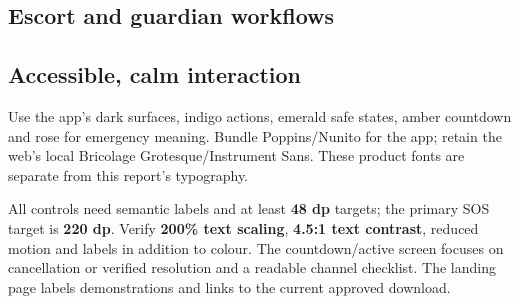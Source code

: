 \subsection{Escort and guardian workflows}
\begin{center}\begin{minipage}{\linewidth}\centering

\end{minipage}\end{center}

\begin{center}\begin{minipage}{\linewidth}\centering

\end{minipage}\end{center}

\subsection{Accessible, calm interaction}
Use the app's dark surfaces, indigo actions, emerald safe states, amber countdown and rose for emergency meaning. Bundle Poppins/Nunito for the app; retain the web's local Bricolage Grotesque/Instrument Sans. These product fonts are separate from this report's typography.

All controls need semantic labels and at least \textbf{48 dp} targets; the primary SOS target is \textbf{220 dp}. Verify \textbf{200\% text scaling}, \textbf{4.5:1 text contrast}, reduced motion and labels in addition to colour. The countdown/active screen focuses on cancellation or verified resolution and a readable channel checklist. The landing page labels demonstrations and links to the current approved download.

